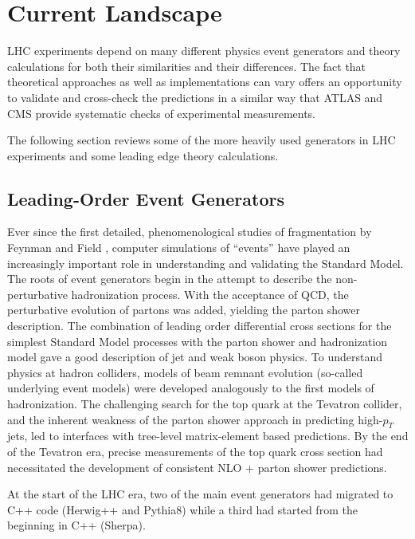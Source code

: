 \documentclass{article}
\begin{document}
\section{Current Landscape}

LHC experiments depend on many different physics event generators and theory calculations for both their similarities and their differences. The fact that theoretical approaches as well as implementations can vary offers an opportunity to validate and cross-check the predictions in a similar way that ATLAS and CMS provide systematic checks of experimental measurements. 

The following section reviews some of the more heavily used generators in LHC experiments and some leading edge theory calculations.

\subsection{Leading-Order Event Generators}
\label{ref:lo_generators}
Ever since the first detailed, phenomenological studies of
fragmentation by Feynman and Field \cite{Field:1977fa}, computer
simulations of ``events'' have played an increasingly important role
in understanding and validating the Standard Model.   
The roots of event generators begin
in the attempt to describe the non-perturbative hadronization process. 
With the acceptance of QCD, the perturbative evolution of partons was
added, yielding the parton shower description.   
The combination of leading order differential cross sections for 
the simplest Standard Model processes with the parton
shower and hadronization
model gave a good description of jet and weak boson physics.
To understand physics at hadron colliders, models of beam remnant
evolution (so-called underlying event models) were developed 
analogously to the first models of hadronization.
The challenging search for
the top quark at the Tevatron collider, and the inherent weakness of
the parton shower approach in predicting high-$p_T$ jets, led to
interfaces with tree-level matrix-element based predictions.
By the end of the Tevatron era, precise measurements of the top quark
cross section had necessitated the development of consistent NLO +
parton shower predictions.

At the start of the LHC era, two of the main event generators had
migrated to C++ code (Herwig++ and Pythia8) while a third had started
from the beginning in C++ (Sherpa).
\end{document}
